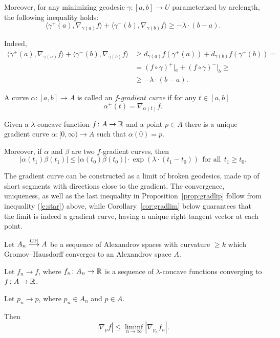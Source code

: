 \documentclass{amsart}
\begin{document}
Moreover, for any minimizing geodesic $\gamma\colon  [a,b]\to U$
parameterized by arclength, the following inequality holds:
\begin{equation}\label{e:star}
\langle \gamma^+(a),\nabla_{\gamma(a)} f\rangle +\langle\gamma^-(b),\nabla_{\gamma(b)} f\rangle
\ge -\lambda\cdot (b-a) .
\end{equation}

Indeed,
\begin{align*}
\langle   \gamma^+(a),  \nabla_{\gamma(a)}  f   \rangle +
\langle  \gamma^-(b),   \nabla_{\gamma(b)} f  \rangle
&\ge
d_{\gamma(a)}f(\gamma^+(a))+d_{\gamma(b)}f(\gamma^-(b))
=
\\
&=
(f\circ\gamma)^+|_a+(f\circ\gamma)^-|_b\ge
\\
&\ge -\lambda\cdot (b-a).
\end{align*}

\begin{defn}A curve $\alpha\colon [a,b] \rightarrow A$ is called an $f$-{\it gradient curve} if for any $t\in [a,b]$
$$\alpha^+(t)=\nabla_{\alpha(t)}f.$$
\end{defn}

\begin{prop}\label{prop:gradlip} Given a $\lambda$-concave function $f\colon A \rightarrow {\Bbb R}$ and a point $p\in A$ there is a unique gradient curve $\alpha\colon [0,\infty) \rightarrow A$ such that $\alpha(0)=p$.

Moreover, if $\alpha$ and $\beta$ are two $f$-gradient curves, then
$$|\alpha(t_1)\beta(t_1)|\le |\alpha(t_0)\beta(t_0)|\cdot \exp(\lambda\cdot  (t_1-t_0))
\ \ \text{for all}\ \ t_1\ge t_0.$$

\end{prop}

The gradient curve  can be constructed as a limit of broken geodesics,
made up of short segments with directions close to the gradient.
The convergence, uniqueness, as well as the last inequality
in Proposition~\ref{prop:gradlip}
follow from
inequality (\ref{e:star}) above, while Corollary~\ref{cor:gradlim}
below guarantees that the limit is indeed
a gradient curve, having a unique right tangent vector at each point.

\begin{lem}\label{lem:gradcon}
 Let $A_n \GHto A$ be a sequence of
Alexandrov spaces with curvature $\ge k$
which Gromov--Hausdorff converges to an Alexandrov space $A$.

Let $f_n\to f$, where $f_n\colon A_n\to {\Bbb R}$ is a sequence of $\lambda$-concave
functions converging to $f\colon A\to {\Bbb R}$.

Let $p_n\to p$,  where $p_n\in A_n$ and $p\in A$.

Then
$$|\nabla_p f|\le \liminf_{n\to \infty} |\nabla_{p_n} f_n|.$$
\end{lem}
\end{document}
